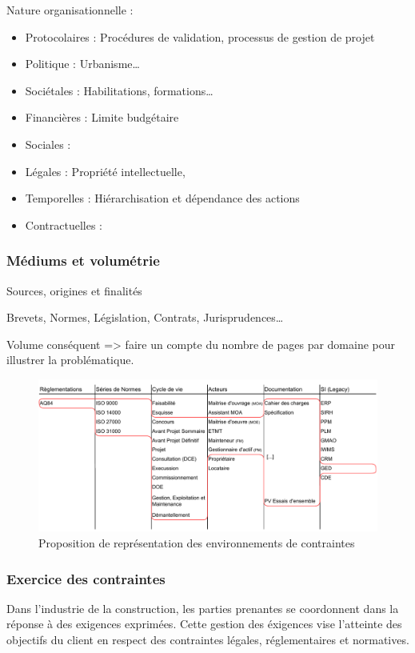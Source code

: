 \documentclass[a4paper,12pt]{article}
\begin{document}
Nature organisationnelle :
\begin{itemize}
\item Protocolaires : Procédures de validation, processus de gestion de projet
\item Politique : Urbanisme\ldots{}
\item Sociétales :  Habilitations, formations\ldots{}
\item Financières : Limite budgétaire
\item Sociales :
\item Légales : Propriété intellectuelle,
\item Temporelles : Hiérarchisation et dépendance des actions
\item Contractuelles :
\end{itemize}
\subsubsection{Médiums et volumétrie}
\label{sec:org3522a78}
Sources, origines et finalités

Brevets, Normes, Législation, Contrats, Jurisprudences\ldots{}

Volume conséquent => faire un compte du nombre de pages par domaine pour illustrer la problématique.

\begin{figure}[htbp]
\centering
\includegraphics[width=.9\linewidth]{./svg/360-view-engineering-environment.pdf}
\caption{\label{fig:orgf2cc33c}Proposition de représentation des environnements de contraintes}
\end{figure}
\subsubsection{Exercice des contraintes}
\label{sec:org85af1d5}
Dans l'industrie de la construction, les parties prenantes se coordonnent dans la réponse à des exigences exprimées. Cette gestion des éxigences vise l'atteinte des objectifs du client en respect des contraintes légales, réglementaires et normatives.
\end{document}
